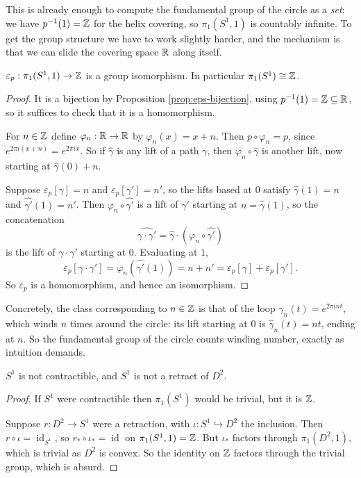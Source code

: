 \documentclass[a4paper]{scrartcl}
\newcommand{\id}{\operatorname{id}}
\begin{document}
This is already enough to compute the fundamental group of the circle as a \emph{set}: we
have $p^{-1}(1) = \mathbb{Z}$ for the helix covering, so $\pi_1(S^1, 1)$ is countably infinite. To
get the group structure we have to work slightly harder, and the mechanism is that we
can slide the covering space $\mathbb{R}$ along itself.

\begin{theorem} \label{thm:pi1-circle}
	$\varepsilon_p: \pi_1(S^1, 1) \to \mathbb{Z}$ is a group isomorphism. In particular $\pi_1(S^1) \cong \mathbb{Z}$.
\end{theorem}
\begin{proof}
	It is a bijection by Proposition \ref{prop:eps-bijection}, using $p^{-1}(1) = \mathbb{Z} \subseteq \mathbb{R}$, so it suffices to check that it is a homomorphism.

	For $n \in \mathbb{Z}$ define $\varphi_n: \mathbb{R} \to \mathbb{R}$ by $\varphi_n(x) = x + n$. Then $p \circ \varphi_n = p$, since $e^{2\pi i (x+n)} = e^{2\pi i x}$. So if $\hat\gamma$ is any lift of a path $\gamma$, then $\varphi_n \circ \hat\gamma$ is another lift, now starting at $\hat\gamma(0) + n$.

	Suppose $\varepsilon_p[\gamma] = n$ and $\varepsilon_p[\gamma'] = n'$, so the lifts based at $0$ satisfy $\hat\gamma(1) = n$ and $\hat{\gamma'}(1) = n'$. Then $\varphi_n \circ \hat{\gamma'}$ is a lift of $\gamma'$ starting at $n = \hat\gamma(1)$, so the concatenation
	$$
	\widehat{\gamma \cdot \gamma'} = \hat\gamma \cdot (\varphi_n \circ \hat{\gamma'})
	$$
	is the lift of $\gamma \cdot \gamma'$ starting at $0$. Evaluating at $1$,
	$$
	\varepsilon_p[\gamma\cdot\gamma'] = \varphi_n(\hat{\gamma'}(1)) = n + n' = \varepsilon_p[\gamma] + \varepsilon_p[\gamma'].
	$$
	So $\varepsilon_p$ is a homomorphism, and hence an isomorphism.
\end{proof}

Concretely, the class corresponding to $n \in \mathbb{Z}$ is that of the loop
$\gamma_n(t) = e^{2\pi i n t}$, which winds $n$ times around the circle: its lift starting
at $0$ is $\hat\gamma_n(t) = nt$, ending at $n$. So the fundamental group of the circle
counts winding number, exactly as intuition demands.

\begin{corollary}
	$S^1$ is not contractible, and $S^1$ is not a retract of $D^2$.
\end{corollary}
\begin{proof}
	If $S^1$ were contractible then $\pi_1(S^1)$ would be trivial, but it is $\mathbb{Z}$.

	Suppose $r: D^2 \to S^1$ were a retraction, with $\iota: S^1 \hookrightarrow D^2$ the inclusion. Then $r \circ \iota = \id_{S^1}$, so $r_* \circ \iota_* = \id$ on $\pi_1(S^1, 1) = \mathbb{Z}$. But $\iota_*$ factors through $\pi_1(D^2, 1)$, which is trivial as $D^2$ is convex. So the identity on $\mathbb{Z}$ factors through the trivial group, which is absurd.
\end{proof}
\end{document}
